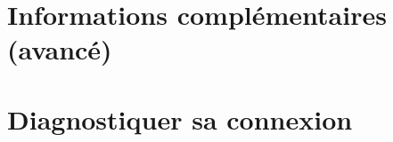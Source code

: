 \clearpage
\section{Informations complémentaires (avancé)}













%

%


\clearpage
\section{Diagnostiquer sa connexion}

\clearpage